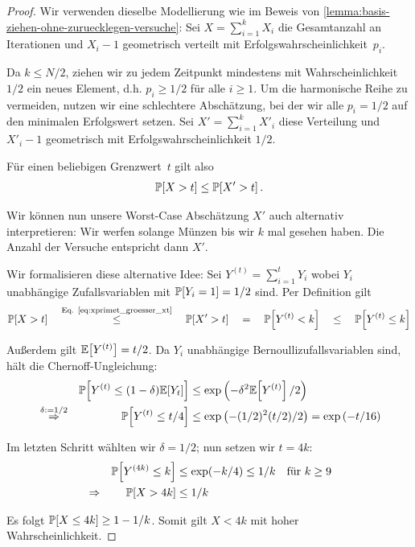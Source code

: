 \begin{proof}
    Wir verwenden dieselbe Modellierung wie im Beweis von \cref{lemma:basis-ziehen-ohne-zuruecklegen-versuche}:
    Sei $X = \sum_{i=1}^k X_i$ die Gesamtanzahl an Iterationen und $X_i - 1$ geometrisch verteilt mit Erfolgswahrscheinlichkeit~$p_i$.

    Da $k \le N/2$, ziehen wir zu jedem Zeitpunkt mindestens mit Wahrscheinlichkeit $1/2$ ein neues Element, d.h. $p_i \ge 1/2$ für alle $i \ge 1$.
    Um die harmonische Reihe zu vermeiden, nutzen wir eine schlechtere Abschätzung, bei der wir alle $p_i = 1/2$ auf den minimalen Erfolgswert setzen.
    Sei $X' = \sum_{i=1}^k X'_i$ diese Verteilung und $X'_i - 1$ geometrisch mit Erfolgswahrscheinlichkeit $1/2$.

    \noindent
    Für einen beliebigen Grenzwert~$t$ gilt also
    \begin{equation}\label{eq:xprimet_groesser_xt}
        \mathbb{P}\!\left[X > t\right] \le \mathbb{P}\!\left[X' > t\right].
    \end{equation}

    Wir können nun unsere Worst-Case Abschätzung $X'$ auch alternativ interpretieren:
    Wir werfen solange Münzen bis wir $k$ mal  gesehen haben.
    Die Anzahl der Versuche entspricht dann $X'$.

    Wir formalisieren diese alternative Idee:
    Sei $Y^{(t)} = \sum_{i=1}^t Y_i$ wobei $Y_i$ unabhängige Zufallsvariablen mit $\mathbb{P}\!\left[Y_i = 1\right] = 1/2$ sind.
    Per Definition gilt
    \begin{equation}
        \mathbb{P}\!\left[X > t\right]
        \quad \stackrel{\text{Eq. \ref{eq:xprimet_groesser_xt}}}{\le} \quad
        \mathbb{P}\!\left[X' > t\right]
        \quad = \quad
        \mathbb{P}\!\left[Y^{(t)} < k\right]
        \quad \le \quad
        \mathbb{P}\!\left[Y^{(t)} \le k\right]
    \end{equation}

    \noindent
    Außerdem gilt $\mathbb{E}\!\left[Y^{(t)}\right] = t/2$.
    Da $Y_i$ unabhängige Bernoullizufallsvariablen sind, hält die Chernoff-Ungleichung:
    \begin{align}
         &                                     & \mathbb{P}\!\left[Y^{(t)} \le (1-\delta) \mathbb{E}\!\left[Y_t\right]\right] & \le \exp\left(-\delta^2 \mathbb{E}\!\left[Y^{(t)}\right] / 2\right)                  \\
         & \stackrel{\delta:=1/2}{\Rightarrow} & \mathbb{P}\!\left[Y^{(t)} \le t / 4\right]                 & \le \exp\left(-(1/2)^2 (t/2) / 2\right) = \exp\left( -t/16 \right)
    \end{align}

    \noindent Im letzten Schritt wählten wir $\delta = 1/2$; nun setzen wir $t = 4k$:
    \begin{align}
         &             & \mathbb{P}\!\left[Y^{(4k)} \le k\right] & \le \exp(-k/4) \le 1/k \quad \text{für } k \ge 9 \\
         & \Rightarrow & \mathbb{P}\!\left[X > 4k\right]         & \le 1/k
    \end{align}

    \noindent
    Es folgt $\mathbb{P}\!\left[X \le 4k\right] \ge 1 - 1/k$. Somit gilt $X < 4k$ mit hoher Wahrscheinlichkeit.
\end{proof}

